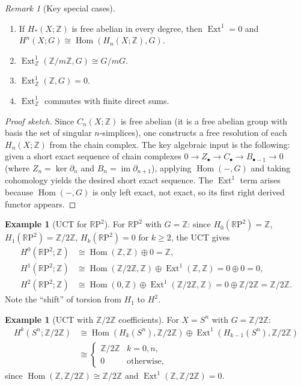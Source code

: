 \documentclass[12pt,a4paper,openany]{book}
\theoremstyle{definition}
\newtheorem{example}[definition]{Example}
\theoremstyle{plain}
\theoremstyle{remark}
\newtheorem{remark}[definition]{Remark}
\newcommand{\Z}{\mathbb{Z}}
\newcommand{\RP}{\mathbb{R}\mathrm{P}}
\DeclareMathOperator{\Hom}{Hom}
\DeclareMathOperator{\im}{im}
\begin{document}
\begin{remark}[Key special cases]
\begin{enumerate}[label=(\roman*)]
  \item If $H_*(X;\Z)$ is free abelian in every degree, then
    $\operatorname{Ext}^1=0$ and
    $H^n(X;G)\cong\Hom(H_n(X;\Z),G)$.
  \item $\operatorname{Ext}^1_\Z(\Z/m\Z,G)\cong G/mG$.
  \item $\operatorname{Ext}^1_\Z(\Z,G)=0$.
  \item $\operatorname{Ext}^1_\Z$ commutes with finite direct sums.
\end{enumerate}
\end{remark}

\begin{proof}[Proof sketch]
Since $C_n(X;\Z)$ is free abelian (it is a free abelian group with
basis the set of singular $n$-simplices), one constructs a free
resolution of each $H_n(X;\Z)$ from the chain complex. The key
algebraic input is the following: given a short exact sequence
of chain complexes $0\to Z_\bullet\to C_\bullet\to B_{\bullet-1}\to 0$
(where $Z_n=\ker\partial_n$ and $B_n=\im\partial_{n+1}$), applying
$\Hom(-,G)$ and taking cohomology yields the desired short exact
sequence. The $\operatorname{Ext}^1$ term arises because $\Hom(-,G)$
is only left exact, not exact, so its first right derived functor
appears.
\end{proof}

\begin{example}[UCT for $\RP^2$]
For $\RP^2$ with $G=\Z$: since $H_0(\RP^2)=\Z$, $H_1(\RP^2)=\Z/2\Z$,
$H_k(\RP^2)=0$ for $k\geq 2$, the UCT gives
\begin{align*}
  H^0(\RP^2;\Z) &\cong \Hom(\Z,\Z)\oplus 0 = \Z,\\
  H^1(\RP^2;\Z) &\cong \Hom(\Z/2\Z,\Z)\oplus \operatorname{Ext}^1(\Z,\Z)
    = 0\oplus 0 = 0,\\
  H^2(\RP^2;\Z) &\cong \Hom(0,\Z)\oplus\operatorname{Ext}^1(\Z/2\Z,\Z)
    = 0\oplus\Z/2\Z = \Z/2\Z.
\end{align*}
Note the ``shift'' of torsion from $H_1$ to $H^2$.
\end{example}

\begin{example}[UCT with $\Z/2\Z$ coefficients]
For $X=S^n$ with $G=\Z/2\Z$:
\begin{align*}
  H^k(S^n;\Z/2\Z) &\cong \Hom(H_k(S^n),\Z/2\Z)
    \oplus\operatorname{Ext}^1(H_{k-1}(S^n),\Z/2\Z)\\
  &\cong
  \begin{cases}
    \Z/2\Z & k=0,n,\\
    0 & \text{otherwise},
  \end{cases}
\end{align*}
since $\Hom(\Z,\Z/2\Z)\cong\Z/2\Z$ and $\operatorname{Ext}^1(\Z,\Z/2\Z)=0$.
\end{example}
\end{document}
